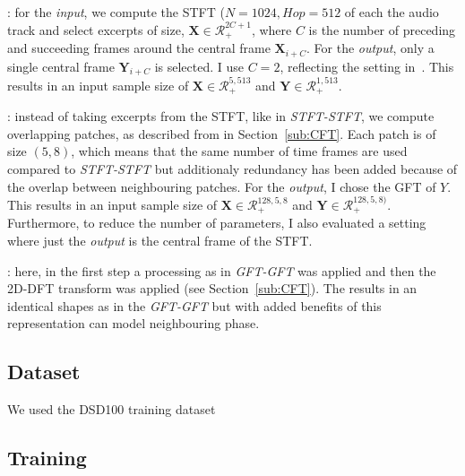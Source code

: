 \begin{description}[style=unboxed,leftmargin=0cm]
\item[STFT-STFT]: for the \emph{input}, we compute the STFT (\(N=1024, Hop=512\) of each the audio track and select excerpts of size, \(\mathbf{X} \in \mathcal{R}^{2C + 1}_{+} \), where \(C\) is the number of preceding and succeeding frames around the central frame \(\mathbf{X}_{i+C}\). For the \emph{output}, only a single central frame \(\mathbf{Y}_{i+C}\) is selected.
I use \(C=2\), reflecting the setting in~\cite{uhlich15}. This results in an input sample size of \(\mathbf{X} \in \mathcal{R}_{+}^{5, 513}\) and  \(\mathbf{Y} \in \mathcal{R}_{+}^{1, 513}\).

\item[GFT-GFT/GFT-STFT]: instead of taking excerpts from the STFT, like in \emph{STFT-STFT}, we compute overlapping patches, as described from in Section~\ref{sub:CFT}. Each patch is of size \((5, 8)\), which means that the same number of time frames are used compared to \emph{STFT-STFT} but additionaly redundancy has been added because of the overlap between neighbouring patches.
For the \emph{output}, I chose the GFT of \(Y\).
This results in an input sample size of \(\mathbf{X} \in \mathcal{R}_{+}^{128, 5, 8}\) and  \(\mathbf{Y} \in \mathcal{R}_{+}^{128, 5, 8)}\).
Furthermore, to reduce the number of parameters, I also evaluated a setting where just the \emph{output} is the central frame of the STFT.

\item[CFT-CFT/CFT-STFT]: here, in the first step a processing as in \emph{GFT-GFT} was applied and then the 2D-DFT transform was applied (see Section~\ref{sub:CFT}).
The results in an identical shapes as in the \emph{GFT-GFT} but with added benefits of this representation can model neighbouring phase.
\end{description}


\subsection{Dataset}

We used the DSD100 training dataset
\subsection{Training}


